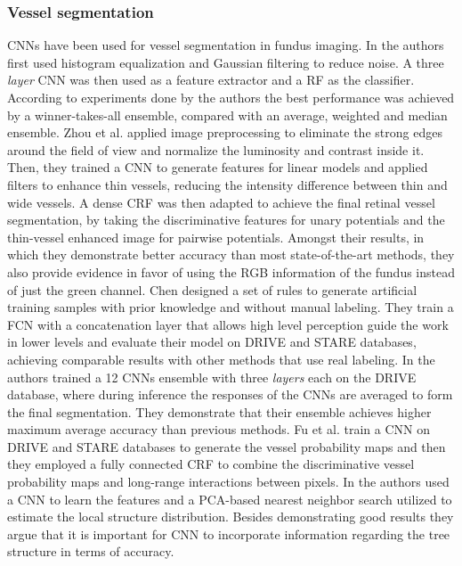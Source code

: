 \documentclass[journal]{IEEEtran}
\begin{document}
\subsubsection{Vessel segmentation}
CNNs have been used for vessel segmentation in fundus imaging.
In\cite{wang2015hierarchical} the authors first used histogram equalization and Gaussian filtering to reduce noise.
A three \textit{layer} CNN was then used as a feature extractor and a RF as the classifier.
According to experiments done by the authors the best performance was achieved by a winner-takes-all ensemble, compared with an average, weighted and median ensemble.
Zhou et al.\cite{zhou2017improving} applied image preprocessing to eliminate the strong edges around the field of view and normalize the luminosity and contrast inside it.
Then, they trained a CNN to generate features for linear models and applied filters to enhance thin vessels, reducing the intensity difference between thin and wide vessels.
A dense CRF was then adapted to achieve the final retinal vessel segmentation, by taking the discriminative features for unary potentials and the thin-vessel enhanced image for pairwise potentials.
Amongst their results, in which they demonstrate better accuracy than most state-of-the-art methods, they also provide evidence in favor of using the RGB information of the fundus instead of just the green channel.
Chen\cite{chen2017labeling} designed a set of rules to generate artificial training samples with prior knowledge and without manual labeling.
They train a FCN with a concatenation layer that allows high level perception guide the work in lower levels and evaluate their model on DRIVE and STARE databases, achieving comparable results with other methods that use real labeling.
In\cite{maji2016ensemble} the authors trained a 12 CNNs ensemble with three \textit{layers} each on the DRIVE database, where during inference the responses of the CNNs are averaged to form the final segmentation.
They demonstrate that their ensemble achieves higher maximum average accuracy than previous methods.
Fu et al.\cite{fu2016retinal} train a CNN on DRIVE and STARE databases to generate the vessel probability maps and then they employed a fully connected CRF to combine the discriminative vessel probability maps and long-range interactions between pixels.
In\cite{wu2016deep} the authors used a CNN to learn the features and a PCA-based nearest neighbor search utilized to estimate the local structure distribution.
Besides demonstrating good results they argue that it is important for CNN to incorporate information regarding the tree structure in terms of accuracy.
\end{document}
